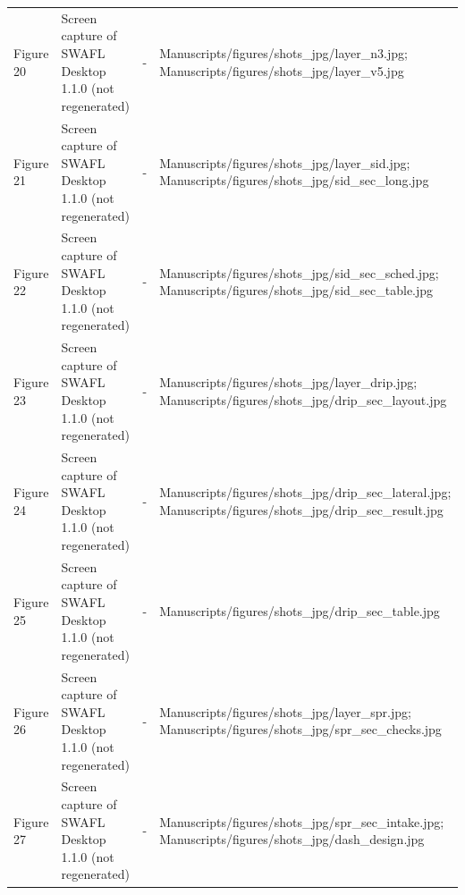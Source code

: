 {\begin{longtable}{p{}p{}p{}p{}}
{}Figure 20 & Screen capture of SWAFL Desktop 1.1.0 (not regenerated) & - & Manuscripts/\allowbreak{}figures/\allowbreak{}shots\_\allowbreak{}jpg/\allowbreak{}layer\_\allowbreak{}n3.jpg;  Manuscripts/\allowbreak{}figures/\allowbreak{}shots\_\allowbreak{}jpg/\allowbreak{}layer\_\allowbreak{}v5.jpg\\
{}Figure 21 & Screen capture of SWAFL Desktop 1.1.0 (not regenerated) & - & Manuscripts/\allowbreak{}figures/\allowbreak{}shots\_\allowbreak{}jpg/\allowbreak{}layer\_\allowbreak{}sid.jpg;  Manuscripts/\allowbreak{}figures/\allowbreak{}shots\_\allowbreak{}jpg/\allowbreak{}sid\_\allowbreak{}sec\_\allowbreak{}long.jpg\\
{}Figure 22 & Screen capture of SWAFL Desktop 1.1.0 (not regenerated) & - & Manuscripts/\allowbreak{}figures/\allowbreak{}shots\_\allowbreak{}jpg/\allowbreak{}sid\_\allowbreak{}sec\_\allowbreak{}sched.jpg;  Manuscripts/\allowbreak{}figures/\allowbreak{}shots\_\allowbreak{}jpg/\allowbreak{}sid\_\allowbreak{}sec\_\allowbreak{}table.jpg\\
{}Figure 23 & Screen capture of SWAFL Desktop 1.1.0 (not regenerated) & - & Manuscripts/\allowbreak{}figures/\allowbreak{}shots\_\allowbreak{}jpg/\allowbreak{}layer\_\allowbreak{}drip.jpg;  Manuscripts/\allowbreak{}figures/\allowbreak{}shots\_\allowbreak{}jpg/\allowbreak{}drip\_\allowbreak{}sec\_\allowbreak{}layout.jpg\\
{}Figure 24 & Screen capture of SWAFL Desktop 1.1.0 (not regenerated) & - & Manuscripts/\allowbreak{}figures/\allowbreak{}shots\_\allowbreak{}jpg/\allowbreak{}drip\_\allowbreak{}sec\_\allowbreak{}lateral.jpg;  Manuscripts/\allowbreak{}figures/\allowbreak{}shots\_\allowbreak{}jpg/\allowbreak{}drip\_\allowbreak{}sec\_\allowbreak{}result.jpg\\
{}Figure 25 & Screen capture of SWAFL Desktop 1.1.0 (not regenerated) & - & Manuscripts/\allowbreak{}figures/\allowbreak{}shots\_\allowbreak{}jpg/\allowbreak{}drip\_\allowbreak{}sec\_\allowbreak{}table.jpg\\
{}Figure 26 & Screen capture of SWAFL Desktop 1.1.0 (not regenerated) & - & Manuscripts/\allowbreak{}figures/\allowbreak{}shots\_\allowbreak{}jpg/\allowbreak{}layer\_\allowbreak{}spr.jpg;  Manuscripts/\allowbreak{}figures/\allowbreak{}shots\_\allowbreak{}jpg/\allowbreak{}spr\_\allowbreak{}sec\_\allowbreak{}checks.jpg\\
{}Figure 27 & Screen capture of SWAFL Desktop 1.1.0 (not regenerated) & - & Manuscripts/\allowbreak{}figures/\allowbreak{}shots\_\allowbreak{}jpg/\allowbreak{}spr\_\allowbreak{}sec\_\allowbreak{}intake.jpg;  Manuscripts/\allowbreak{}figures/\allowbreak{}shots\_\allowbreak{}jpg/\allowbreak{}dash\_\allowbreak{}design.jpg\\

\end{longtable}}
